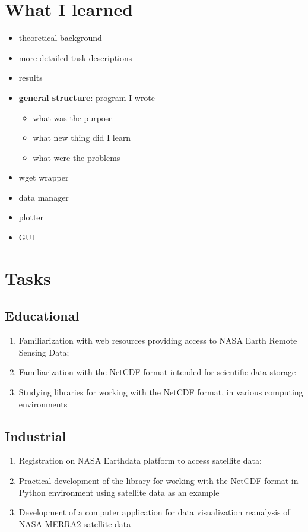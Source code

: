 \documentclass[../00_main.tex]{subfiles}
\begin{document}
\section{What I learned}

\begin{itemize}
    \item theoretical background
    \item more detailed task descriptions
    \item results
    \item \textbf{general structure}: program I wrote
    \begin{itemize}
        \item what was the purpose
        \item what new thing did I learn
        \item what were the problems 
    \end{itemize}
    \item wget wrapper
    \item data manager
    \item plotter
    \item GUI
\end{itemize}

\section{Tasks}

\subsection{Educational}

\begin{enumerate}
    \item Familiarization with web resources providing access to NASA Earth 
        Remote Sensing Data;
    \item Familiarization with the NetCDF format intended for scientific data 
        storage
    \item Studying libraries for working with the NetCDF format, in various 
        computing environments
\end{enumerate}

\subsection{Industrial}

\begin{enumerate}
    \item Registration on NASA Earthdata platform to access satellite data;
    \item Practical development of the library for working with the NetCDF 
        format in Python environment using satellite data as an example
    \item Development of a computer application for data visualization 
        reanalysis of NASA MERRA2 satellite data
\end{enumerate}
\end{document}
